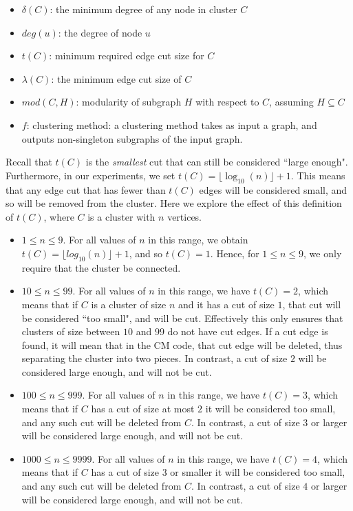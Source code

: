 \documentclass[a4paper]{article}   	%
\begin{document}
\begin{itemize}
    \item $\delta(C)$: the minimum degree of  any node in cluster $C$
    \item $deg(u)$: the degree of node $u$
    \item $t(C)$: minimum required edge cut size for  $C$
    \item $\lambda(C)$: the minimum edge cut size of $C$
    \item $mod(C, H)$: modularity of subgraph $H$ with respect to $C$, assuming $H \subseteq C$
    \item $f$: clustering method: a clustering method takes as input a graph, and outputs non-singleton subgraphs of the input graph.
\end{itemize}

Recall that  $t(C)$ is the {\em smallest} cut that can still be considered ``large enough".
Furthermore, in our experiments, we set $t(C) = \lfloor \log_{10}(n) \rfloor +1$.  This means that any edge cut that has fewer than $t(C)$ edges
will be considered small, and so will be removed from the cluster.
Here we explore the effect of this definition of $t(C)$, where $C$ is a cluster with $n$ vertices.
\begin{itemize}
\item
$1 \leq n \leq 9$.
For all values of $n$ in this range, we obtain $t(C) = \lfloor log_{10}(n) \rfloor +1$, and so $t(C) = 1$.  Hence, for $1 \leq n \leq 9$, we  only require that the
cluster be connected.
\item
$10 \leq n \leq 99$. For all values of $n$ in this range, we have
 $t(C) = 2$, which means that if $C$ is a cluster of size $n$ and it has a cut of size $1$, that  cut will
be considered ``too small", and will be cut.  Effectively this only ensures that clusters of size between $10$ and $99$ do not have cut edges.
If a cut edge is found, it will mean that in the CM code, that cut edge will be deleted, thus separating the cluster into two pieces.
In contrast, a cut of size $2$ will be considered large enough, and will not be cut.
\item
$100 \leq n \leq 999$.
For all values of $n$ in this range, we have $t(C)=3$, which means that if $C$ has a cut of size  at most $2$ it will be considered
too small, and any such cut will be deleted from $C$.
In contrast, a cut of size $3$  or larger will be considered large enough, and will not be cut.
\item
$1000 \leq n \leq 9999$.
For all values of $n$ in this range, we have $t(C)=4$, which means that if $C$ has a cut of size $3$ or smaller it will be considered
too small, and any such cut will be deleted from $C$.
In contrast, a cut of size $4$ or larger will be considered large enough, and will not be cut.
\end{itemize}
\end{document}
